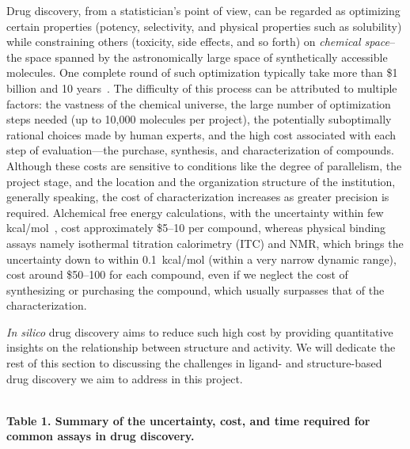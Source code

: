 \documentclass[11pt]{article}
\begin{document}
Drug discovery, from a statistician's point of view, can be regarded as optimizing certain properties (potency, selectivity, and physical properties such as solubility) while constraining others (toxicity, side effects, and so forth) on \textit{chemical space}--the space spanned by the astronomically large space of synthetically accessible molecules. One complete round of such optimization typically take more than \$1 billion and 10 years~\cite{Paul2010}. 
The difficulty of this process can be attributed to multiple factors: the vastness of the chemical universe, the large number of optimization steps needed (up to 10,000 molecules per project), the potentially suboptimally rational choices made by human experts, and the high cost associated with each step of evaluation---the purchase, synthesis, and characterization of compounds. Although these costs are sensitive to conditions like the degree of parallelism, the project stage, and the location and the organization structure of the institution, generally speaking, the cost of characterization increases as greater precision is required. Alchemical free energy calculations, with the uncertainty within few kcal/mol~\cite{pmid28430432}, cost approximately \$5--10 per compound, whereas physical binding assays namely isothermal titration calorimetry (ITC) and NMR, which brings the uncertainty down to within 0.1~kcal/mol (within a very narrow dynamic range), cost around \$50--100 for each compound, even if we neglect the cost of synthesizing or purchasing the compound, which usually surpasses that of the characterization.

\textit{In silico}  drug discovery aims to reduce such high cost by providing quantitative insights on the relationship between structure and activity. We will dedicate the rest of this section to discussing the challenges in ligand- and structure-based drug discovery we aim to address in this project.\\\\

\begin{minipage}[tb]{\linewidth}
    \small
    \centering
{}
\textbf{Table 1. Summary of the uncertainty, cost, and time required for common assays in drug discovery.}
\end{minipage}\\\\
\end{document}
